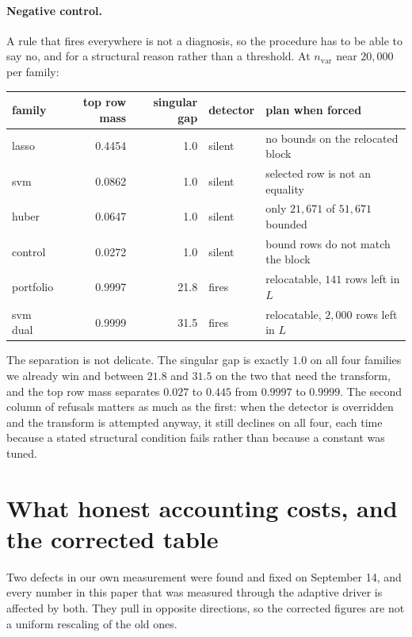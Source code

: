 \documentclass[11pt]{article}
\begin{document}
\paragraph{Negative control.}
A rule that fires everywhere is not a diagnosis, so the procedure has to be
able to say no, and for a structural reason rather than a threshold. At
$n_{\mathrm{var}}$ near $20{,}000$ per family:

\begin{center}
\begin{tabular}{lrrll}
\toprule
family & top row mass & singular gap & detector & plan when forced \\
\midrule
lasso     & 0.4454 & 1.0  & silent & no bounds on the relocated block \\
svm       & 0.0862 & 1.0  & silent & selected row is not an equality \\
huber     & 0.0647 & 1.0  & silent & only $21{,}671$ of $51{,}671$ bounded \\
control   & 0.0272 & 1.0  & silent & bound rows do not match the block \\
portfolio & 0.9997 & 21.8 & fires  & relocatable, $141$ rows left in $L$ \\
svm dual  & 0.9999 & 31.5 & fires  & relocatable, $2{,}000$ rows left in $L$ \\
\bottomrule
\end{tabular}
\end{center}

The separation is not delicate. The singular gap is exactly $1.0$ on all
four families we already win and between $21.8$ and $31.5$ on the two that
need the transform, and the top row mass separates $0.027$ to $0.445$ from
$0.9997$ to $0.9999$. The second column of refusals matters as much as the
first: when the detector is overridden and the transform is attempted
anyway, it still declines on all four, each time because a stated structural
condition fails rather than because a constant was tuned.

\section{What honest accounting costs, and the corrected table}
\label{app:accounting}

Two defects in our own measurement were found and fixed on September 14, and
every number in this paper that was measured through the adaptive driver is
affected by both. They pull in opposite directions, so the corrected figures
are not a uniform rescaling of the old ones.
\end{document}

